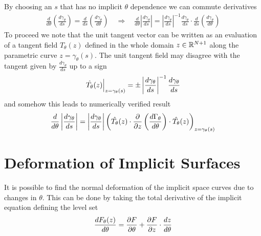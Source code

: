 By choosing an $s$ that has no implicit $\theta$ dependence we can commute derivatives
\begin{align}
    \frac{d}{d\theta}\left(\frac{d\gamma_{\theta}}{ds}\right)
    = \frac{d}{ds}\left(\frac{d\gamma_{\theta}}{d\theta}\right)
    \quad\Rightarrow\quad
    \frac{d}{d\theta}\left|\frac{d\gamma_{\theta}}{ds}\right|=
    \left|\frac{d\gamma_{\theta}}{ds}\right|^{-1}
    \frac{d\gamma_{\theta}}{ds}\cdot\frac{d}{d s}
    \left(\frac{d\gamma_{\theta}}{d\theta}\right)
\end{align}
To proceed we note that the unit tangent vector can be written as an evaluation of a tangent field $\hat{T}_{\theta}(z)$ defined in the whole domain $z\in\mathbb{R}^{N+1}$ along the parametric curve $z=\gamma_{\theta}(s)$. The unit tangent field may disagree with the tangent given by $\frac{d\gamma_{\theta}}{ds}$ up to a sign
\begin{align}
    \left.\hat{T_{\theta}}(z)\right|_{z=\gamma_{\theta}(s)}=
    \pm\left|\frac{d\gamma_{\theta}}{ds}\right|^{-1}\frac{d\gamma_{\theta}}{d s}
\end{align}
and somehow this leads to numerically verified result%
\begin{align}
    \frac{d}{d\theta}\left|\frac{d\gamma_{\theta}}{ds}\right|=
    \left|\frac{d\gamma_{\theta}}{ds}\right|\left(
   \hat{T_{\theta}}(z)\cdot\frac{\partial }{\partial z}\left(\frac{d\Gamma_{\theta}}{d \theta}\right)\cdot
   \hat{T_{\theta}}(z)
    \right)_{z=\gamma_\theta(s)}
    \label{eq:divergence-term}
\end{align}

\section{Deformation of Implicit Surfaces}
\label{appendix:deformation}
It is possible to find the normal deformation of the implicit space curves due to changes in $\theta$. This can be done by taking the total derivative of the implicit equation defining the level set
\begin{align}
    \frac{dF_{\theta}(z)}{d\theta}=\frac{\partial F}{\partial\theta}+
    \frac{\partial F}{\partial z}\cdot\frac{d z}{d \theta}
\end{align}


